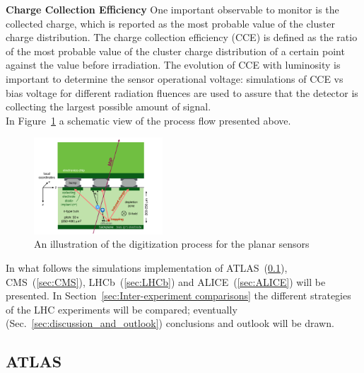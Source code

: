 \noindent
\textbf{Charge Collection Efficiency}
One important observable to monitor is the collected charge, which is reported as the most probable value of the cluster charge  distribution. The charge collection efficiency (CCE) is defined as the ratio of the most probable value of the cluster charge distribution of a certain point against the value  before  irradiation. The evolution of CCE with luminosity is important 
to determine the sensor operational voltage: simulations of CCE vs bias voltage for different radiation fluences are 
used to assure that the detector is collecting the largest possible amount of signal.\\

\noindent In Figure~\ref{digitizer_diagram} a schematic view of the process flow presented above.
\begin{figure}[htbp]
\begin{center}
\includegraphics[width=0.43\textwidth]{figures/SensorSimulation/digitizer_diagram.pdf}
\caption{An illustration of the digitization process for the planar sensors~\cite{Aaboud:2019wgd}}
\label{digitizer_diagram}
\end{center}
\end{figure}

\noindent
In what follows the simulations implementation of ATLAS~(\ref{sec:ATLAS}), CMS~(\ref{sec:CMS}), 
LHCb~(\ref{sec:LHCb}) and ALICE~(\ref{sec:ALICE}) will be presented. In Section~\ref{sec:Inter-experiment comparisons}  
the different strategies of the LHC experiments will be compared; eventually (Sec.~\ref{sec:discussion_and_outlook}) 
conclusions and outlook will be drawn.


\subsection{ATLAS}
\label{sec:ATLAS}

